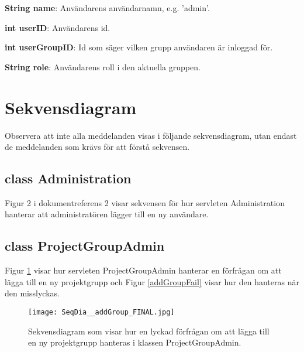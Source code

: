 \documentclass[a4paper]{article}
\begin{document}
\vspace{5mm}
\begin{hangparas}{1.5em}{1}
\textbf{String name}: Användarens användarnamn, e.g. 'admin'. 
\end{hangparas}

\vspace{5mm}
\begin{hangparas}{1.5em}{1}
\textbf{int userID}: Användarens id. 
\end{hangparas}

\vspace{5mm}
\begin{hangparas}{1.5em}{1}
\textbf{int userGroupID}: Id som säger vilken grupp användaren är inloggad för. 
\end{hangparas}

\vspace{5mm}
\begin{hangparas}{1.5em}{1}
\textbf{String role}: Användarens roll i den aktuella gruppen.
\end{hangparas}

\section{Sekvensdiagram}

Observera att inte alla meddelanden visas i följande sekvensdiagram, utan endast de meddelanden som krävs för att förstå sekvensen.

\subsection{class Administration}
Figur 2 i dokumentreferens 2 visar sekvensen för hur servleten Administration hanterar att administratören lägger till en ny användare.


\subsection{class ProjectGroupAdmin}
Figur \ref{addGroup} visar hur servleten ProjectGroupAdmin hanterar en förfrågan om att lägga till en ny projektgrupp och Figur \ref{addGroupFail} visar hur den hanteras när den misslyckas. 

\begin{figure}[h!]
\centering
\texttt{[image: SeqDia\_\_addGroup\_FINAL.jpg]}
\caption{Sekvensdiagram som visar hur en lyckad förfrågan om att lägga till en ny projektgrupp hanteras i klassen ProjectGroupAdmin. \label{addGroup}}
\end{figure}
\end{document}
